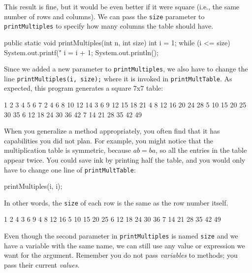 \documentclass[12pt]{book}
\theoremstyle{exercise}
\newcommand{\java}[1]{\verb"#1"}
\newcommand{\java}[1]{\lstinline{#1}} %
\begin{document}
This result is fine, but it would be even better if it were square (i.e., the same number of rows and columns).
We can pass the \java{size} parameter to \java{printMultiples} to specify how many columns the table should have.

\begin{code}
    public static void printMultiples(int n, int size) {
        int i = 1;
        while (i <= size) {
            System.out.printf("%
            i = i + 1;
        }
        System.out.println();
    }
\end{code}


Since we added a new parameter to \java{printMultiples}, we also have to change the line \java{printMultiples(i, size);} where it is invoked in \java{printMultTable}.
As expected, this program generates a square 7x7 table:

\begin{stdout}
   1   2   3   4   5   6   7
   2   4   6   8  10  12  14
   3   6   9  12  15  18  21
   4   8  12  16  20  24  28
   5  10  15  20  25  30  35
   6  12  18  24  30  36  42
   7  14  21  28  35  42  49
\end{stdout}

When you generalize a method appropriately, you often find that it has capabilities you did not plan.
For example, you might notice that the multiplication table is symmetric, because $ab = ba$, so all the entries in the table appear twice.
You could save ink by printing half the table, and you would only have to change one line of \java{printMultTable}:

\begin{code}
      printMultiples(i, i);
\end{code}

In other words, the \java{size} of each row is the same as the row number itself.

\begin{stdout}
   1
   2   4
   3   6   9
   4   8  12  16
   5  10  15  20  25
   6  12  18  24  30  36
   7  14  21  28  35  42  49
\end{stdout}

Even though the second parameter in \java{printMultiples} is named \java{size} and we have a variable with the same name, we can still use any value or expression we want for the argument.
Remember you do not pass {\em variables} to methods; you pass their current {\em values}.
\end{document}
